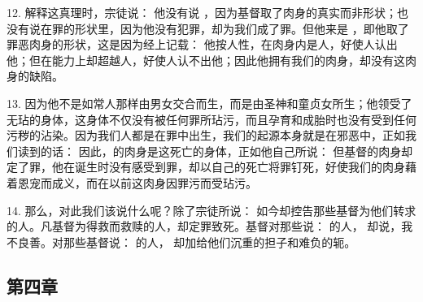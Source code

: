 12. 解释这真理时，宗徒说：  他没有说 ，因为基督取了肉身的真实而非形状；也没有说在罪的形状里，因为他没有犯罪，却为我们成了罪。但他来是 ，即他取了罪恶肉身的形状，这是因为经上记载： 他按人性，在肉身内是人，好使人认出他；但在能力上却超越人，好使人认不出他；因此他拥有我们的肉身，却没有这肉身的缺陷。\par

13. 因为他不是如常人那样由男女交合而生，而是由圣神和童贞女所生；他领受了无玷的身体，这身体不仅没有被任何罪所玷污，而且孕育和成胎时也没有受到任何污秽的沾染。因为我们人都是在罪中出生，我们的起源本身就是在邪恶中，正如我们读到的话： 因此，的肉身是这死亡的身体，正如他自己所说：  但基督的肉身却定了罪，他在诞生时没有感受到罪，却以自己的死亡将罪钉死，好使我们的肉身藉着恩宠而成义，而在以前这肉身因罪污而受玷污。\par

14. 那么，对此我们该说什么呢？除了宗徒所说：  如今却控告那些基督为他们转求的人。凡基督为得救而救赎的人，却定罪致死。基督对那些说： 的人， 却说，我不良善。对那些基督说： 的人， 却加给他们沉重的担子和难负的轭。\par


\subsection{第四章}

\par

